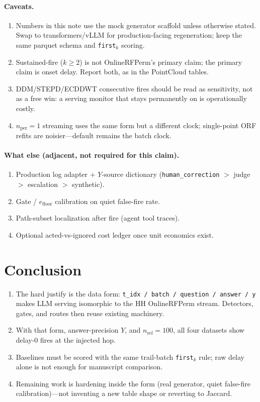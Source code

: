 \documentclass[11pt]{article}
\begin{document}
\paragraph{Caveats.}
\begin{enumerate}[leftmargin=1.2em]
\item Numbers in this note use the mock generator scaffold unless otherwise
stated. Swap to transformers/vLLM for production-facing regeneration; keep the
same parquet schema and \texttt{first}$_k$ scoring.
\item Sustained-fire ($k\ge 2$) is not OnlineRFPerm's primary claim; the primary
claim is onset delay. Report both, as in the PointCloud tables.
\item DDM/STEPD/ECDDWT consecutive fires should be read as sensitivity, not as
a free win: a serving monitor that stays permanently on is operationally costly.
\item $n_{\mathrm{per}}=1$ streaming uses the same form but a different clock;
single-point ORF refits are noisier---default remains the batch clock.
\end{enumerate}

\paragraph{What else (adjacent, not required for this claim).}
\begin{enumerate}[leftmargin=1.2em]
\item Production log adapter + $Y$-source dictionary
(\texttt{human\_correction} $>$ judge $>$ escalation $>$ synthetic).
\item Gate / $e_{\mathrm{floor}}$ calibration on quiet false-fire rate.
\item Path-subset localization after fire (agent tool traces).
\item Optional acted-vs-ignored cost ledger once unit economics exist.
\end{enumerate}

\section{Conclusion}
\begin{enumerate}[leftmargin=1.2em]
\item The hard justify is the data form:
\texttt{t\_idx / batch / question / answer / y} makes LLM serving isomorphic to
the HH OnlineRFPerm stream. Detectors, gates, and routes then reuse existing
machinery.
\item With that form, answer-precision $Y$, and $n_{\mathrm{ref}}=100$, all four
datasets show delay-$0$ fires at the injected hop.
\item Baselines must be scored with the same trail-batch \texttt{first}$_k$ rule;
raw delay alone is not enough for manuscript comparison.
\item Remaining work is hardening inside the form (real generator, quiet
false-fire calibration)---not inventing a new table shape or reverting to Jaccard.
\end{enumerate}
\end{document}
